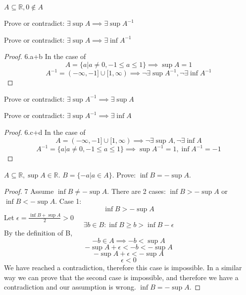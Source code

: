 \documentclass[12pt]{article}
\newenvironment{problem}[2][Problem]{\begin{trivlist}
\item[\hskip \labelsep {\bfseries #1}\hskip \labelsep {\bfseries #2.}]}{\end{trivlist}}
\begin{document}
\begin{problem}{6}
	$A \subseteq \mathbb{R}, 0 \notin A$

\begin{problem}{6.a}
	Prove or contradict: $\exists \sup A \implies \exists \sup A^{-1}$
\end{problem}

\begin{problem}{6.b}
	Prove or contradict: $\exists \sup A \implies \exists \inf A^{-1}$
\end{problem}

\begin{proof}{6.a+b}
	In the case of $$A = \{a | a \ne 0, -1 \le a \le 1\} \implies \sup A = 1 $$
	$$ A^{-1} = (-\infty, -1] \cup [1,\infty) \implies \lnot \exists \sup A^{-1}, \lnot \exists \inf A^{-1}$$
\end{proof}

\begin{problem}{6.c}
	Prove or contradict: $\exists \sup A^{-1} \implies \exists \sup A$
\end{problem}

\begin{problem}{6.d}
	Prove or contradict: $\exists \sup A^{-1} \implies \exists \inf A$
\end{problem}

\begin{proof}{6.c+d}
	In the case of $$A = (-\infty, -1] \cup [1,\infty) \implies \lnot \exists \sup A, \lnot \exists \inf A$$
	$$ A^{-1} = \{a | a \ne 0, -1 \le a \le 1\} \implies \sup A^{-1} = 1, \inf A^{-1} = -1$$
\end{proof}

\end{problem}

\begin{problem}{7}
	$A \subseteq \mathbb{R}, \sup A \in \mathbb{R}$. $B = \{-a | a \in A\}$. Prove: $\inf B = -\sup A$.
\end{problem}

\begin{proof}{7}
	Assume $\inf B \ne -\sup A$. There are 2 cases: $\inf B > -\sup A$ or $\inf B < -\sup A$.
	Case 1:
	$$\inf B > -\sup A$$
	Let $\epsilon = \frac{\inf B + \sup A}{2} > 0$
	$$\exists b \in B: \inf B \ge b > \inf B - \epsilon$$
	By the definition of B,
	$$-b \in A \implies -b < \sup A$$
	$$ -\sup A + \epsilon < -b < -\sup A$$
	$$ -\sup A + \epsilon < -\sup A$$
	$$ \epsilon < 0$$
	We have reached a contradiction, therefore this case is impossible. In a similar way we can prove that the second case is impossible, and therefore we have a contradiction and our assumption is wrong. $\inf B = -\sup A$.
\end{proof}
\end{document}
